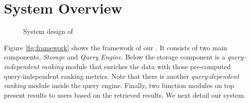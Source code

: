 \section{System Overview}
\label{sec-system}

\begin{figure}
\centering
{}
\hspace{3ex}
\caption{System design of \oursystem}
\label{fig:system}
\end{figure}


Figure \ref{fig:framework} shows the framework of our \oursystem. It consists of two main components, \ie \emph{Storage} and \emph{Query Engine}.
Below the storage component is a {\em query-independent ranking} module that enriches the data with those pre-computed query-independent ranking metrics. Note that there is another {\em query-dependent ranking} module inside the query engine. Finally, two function modules on top present results to users based on the retrieved results. We next detail our system.

